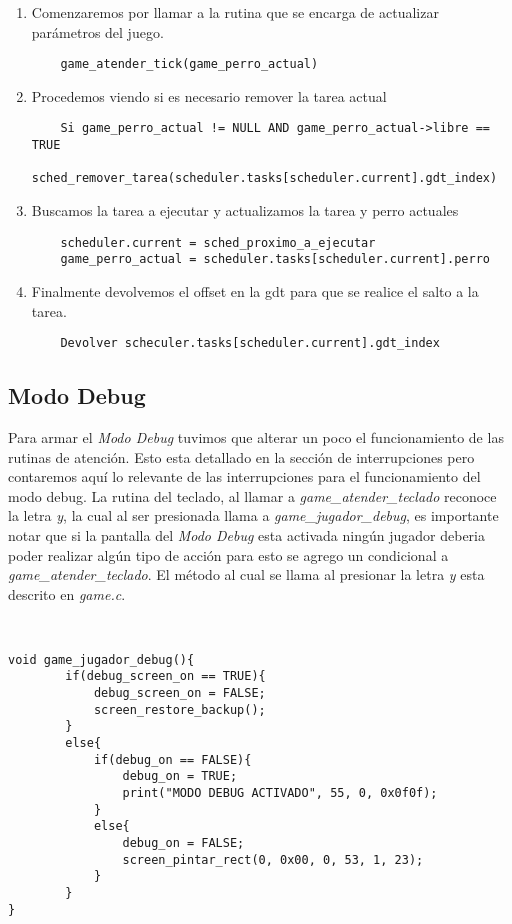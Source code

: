 \begin{enumerate}
	\item Comenzaremos por llamar a la rutina que se encarga de actualizar
		parámetros del juego.
	\begin{lstlisting}
	game_atender_tick(game_perro_actual)
	\end{lstlisting}
	\item Procedemos viendo si es necesario remover la tarea actual
	\begin{lstlisting}
	Si game_perro_actual != NULL AND game_perro_actual->libre == TRUE
		sched_remover_tarea(scheduler.tasks[scheduler.current].gdt_index)
	\end{lstlisting}
	\item Buscamos la tarea a ejecutar y actualizamos la tarea y perro actuales
	\begin{lstlisting}
	scheduler.current = sched_proximo_a_ejecutar
	game_perro_actual = scheduler.tasks[scheduler.current].perro
	\end{lstlisting}
	\item Finalmente devolvemos el offset en la gdt para que se realice el salto
		a la tarea.
	\begin{lstlisting}
	Devolver scheculer.tasks[scheduler.current].gdt_index
	\end{lstlisting}
\end{enumerate}

\subsection{Modo Debug}

Para armar el \textit{Modo Debug} tuvimos que alterar un poco el funcionamiento de las rutinas de atención. Esto esta detallado en la sección de interrupciones pero contaremos aquí lo relevante de las interrupciones para el funcionamiento del modo debug. La rutina del teclado, al llamar a \textit{game\_atender\_teclado} reconoce la letra \textit{y}, la cual al ser presionada llama a \textit{game\_jugador\_debug}, es importante notar que si la pantalla del \textit{Modo Debug} esta activada ningún jugador deberia poder realizar algún tipo de acción para esto se agrego un condicional a \textit{game\_atender\_teclado}. El método al cual se llama al presionar la letra \textit{y} esta descrito en \textit{game.c}.

\begin{lstlisting}


void game_jugador_debug(){
		if(debug_screen_on == TRUE){
			debug_screen_on = FALSE;
			screen_restore_backup();
		}
		else{
			if(debug_on == FALSE){
				debug_on = TRUE;
				print("MODO DEBUG ACTIVADO", 55, 0, 0x0f0f);
			}
			else{
				debug_on = FALSE;
				screen_pintar_rect(0, 0x00, 0, 53, 1, 23);
			}
		}
}

\end{lstlisting}

